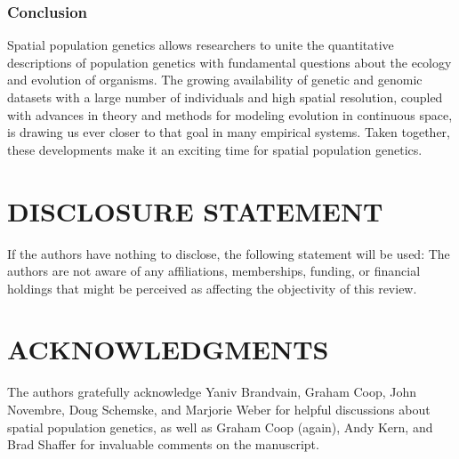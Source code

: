 \documentclass{ar-1col}
\begin{document}
\subsubsection{Conclusion}

Spatial population genetics allows researchers to 
unite the quantitative descriptions of population genetics 
with fundamental questions about the ecology and evolution of organisms.
The growing availability of genetic and genomic datasets 
with a large number of individuals and high spatial resolution, 
coupled with advances in theory and methods 
for modeling evolution in continuous space, 
is drawing us ever closer to that goal in many empirical systems.
Taken together, these developments make it 
an exciting time for spatial population genetics.



\section*{DISCLOSURE STATEMENT}
If the authors have nothing to disclose, the following statement will be used: 
The authors are not aware of any affiliations, memberships, funding, or financial holdings 
that might be perceived as affecting the objectivity of this review.

\section*{ACKNOWLEDGMENTS}
The authors gratefully acknowledge 
Yaniv Brandvain, Graham Coop, 
John Novembre, Doug Schemske, 
and Marjorie Weber for helpful discussions about spatial population genetics,
as well as Graham Coop (again), Andy Kern, and Brad Shaffer 
for invaluable comments on the manuscript.



\end{document}
